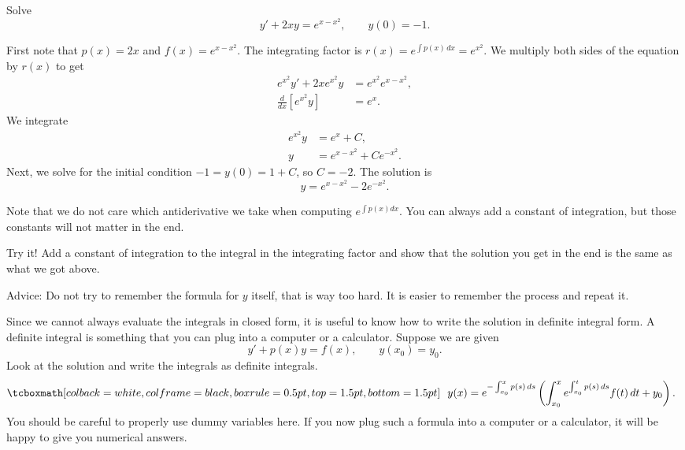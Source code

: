 \begin{example}
Solve
\begin{equation*}
y' + 2xy = e^{x-x^2}, \qquad y(0) = -1 .
\end{equation*}

First note that $p(x) = 2x$ and $f(x) = e^{x-x^2}$.
The integrating factor is $r(x) = e^{\int p(x)\, dx} = e^{x^2}$.
We multiply both sides of the equation by $r(x)$ to get
\begin{equation*}
\begin{aligned}
e^{x^2} y' + 2xe^{x^2}y & = e^{x^2} e^{x-x^2} , \\
\frac{d}{dx} \left[ e^{x^2} y \right] &= e^x .
\end{aligned}
\end{equation*}
We integrate
\begin{equation*}
\begin{aligned}
e^{x^2} y &= e^x +C , \\
y &= e^{x-x^2} + C e^{-x^2} .
\end{aligned}
\end{equation*}
Next, we solve for the initial condition $-1 = y(0) = 1 + C$, so $C=-2$.
The solution is
\begin{equation*}
y = e^{x-x^2} - 2 e^{-x^2} .
\end{equation*}
\end{example}

Note that we do not care which antiderivative we take when computing
$e^{\int p(x) dx}$.  You can always add a constant of integration,
but those constants
will not matter in the end.

\begin{exercise}
Try it!  Add a constant of integration to the integral in
the integrating factor and show that the solution you get in the end is the
same as what we got above.
\end{exercise}

Advice: Do not try to remember the formula for $y$ itself, that is way too
hard.  It is easier to remember the process and repeat it.

Since we cannot always evaluate the integrals in closed form, it is useful to
know how to write the solution in definite integral form.  A definite
integral is something that
you can plug into a computer or a calculator.  Suppose we are given
\begin{equation*}
y' + p(x) y = f(x) , \qquad y(x_0) = y_0 .
\end{equation*}
Look at the solution and write the integrals
as definite integrals.
\begin{equation} \label{lei:defsol}
\mybxbg{
~~
y(x) = e^{-\int_{x_0}^x p(s)\, ds} \left( \int_{x_0}^x e^{\int_{x_0}^t p(s)\, ds}
f(t) \,dt + y_0 \right).
~~
}
\end{equation}
You should
be careful to properly use dummy variables here.  If you now plug such a
formula into a
computer or a calculator, it will be happy to give you numerical answers.

